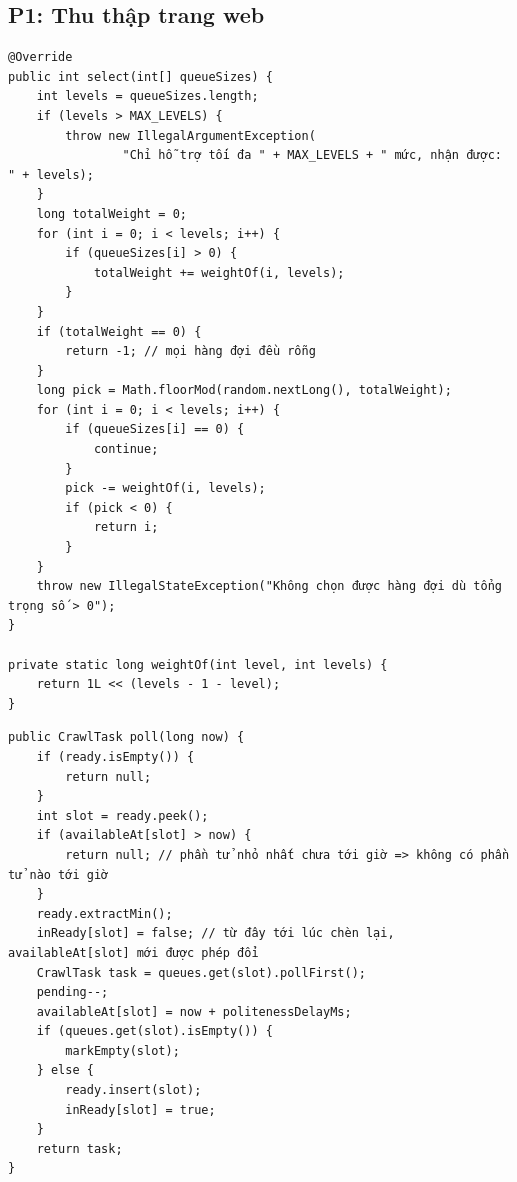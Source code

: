 \documentclass[9pt,twocolumn,a4paper]{extarticle}
\newcommand{\code}[1]{\texttt{#1}}
\begin{document}
\subsection{P1: Thu thập trang web}
\begin{minipage}{\linewidth}
\begin{lstlisting}[caption={\code{frontier/WeightedRandomSelector.java}, \code{select}: chọn hàng đợi tầng trước theo trọng số $2^{L-1-i}$},label={lst:selector}]
@Override
public int select(int[] queueSizes) {
    int levels = queueSizes.length;
    if (levels > MAX_LEVELS) {
        throw new IllegalArgumentException(
                "Chỉ hỗ trợ tối đa " + MAX_LEVELS + " mức, nhận được: " + levels);
    }
    long totalWeight = 0;
    for (int i = 0; i < levels; i++) {
        if (queueSizes[i] > 0) {
            totalWeight += weightOf(i, levels);
        }
    }
    if (totalWeight == 0) {
        return -1; // mọi hàng đợi đều rỗng
    }
    long pick = Math.floorMod(random.nextLong(), totalWeight);
    for (int i = 0; i < levels; i++) {
        if (queueSizes[i] == 0) {
            continue;
        }
        pick -= weightOf(i, levels);
        if (pick < 0) {
            return i;
        }
    }
    throw new IllegalStateException("Không chọn được hàng đợi dù tổng trọng số > 0");
}

private static long weightOf(int level, int levels) {
    return 1L << (levels - 1 - level);
}
\end{lstlisting}
\end{minipage}
\par\vspace{4pt}

\begin{minipage}{\linewidth}
\begin{lstlisting}[caption={\code{frontier/BackQueues.java}, \code{poll}: lấy URL của host tới giờ sớm nhất},label={lst:backpoll}]
public CrawlTask poll(long now) {
    if (ready.isEmpty()) {
        return null;
    }
    int slot = ready.peek();
    if (availableAt[slot] > now) {
        return null; // phần tử nhỏ nhất chưa tới giờ => không có phần tử nào tới giờ
    }
    ready.extractMin();
    inReady[slot] = false; // từ đây tới lúc chèn lại, availableAt[slot] mới được phép đổi
    CrawlTask task = queues.get(slot).pollFirst();
    pending--;
    availableAt[slot] = now + politenessDelayMs;
    if (queues.get(slot).isEmpty()) {
        markEmpty(slot);
    } else {
        ready.insert(slot);
        inReady[slot] = true;
    }
    return task;
}
\end{lstlisting}
\end{minipage}
\par\vspace{4pt}
\end{document}
